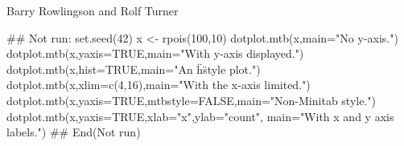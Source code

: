 \begin{Author}\relax
Barry Rowlingson
and Rolf Turner
\end{Author}
\begin{Examples}
\begin{ExampleCode}
## Not run: 
set.seed(42)
x <- rpois(100,10)
dotplot.mtb(x,main="No y-axis.")
dotplot.mtb(x,yaxis=TRUE,main="With y-axis displayed.")
dotplot.mtb(x,hist=TRUE,main="An \"h\" style plot.")
dotplot.mtb(x,xlim=c(4,16),main="With the x-axis limited.")
dotplot.mtb(x,yaxis=TRUE,mtbstyle=FALSE,main="Non-Minitab style.")
dotplot.mtb(x,yaxis=TRUE,xlab="x",ylab="count",
            main="With x and y axis labels.")
## End(Not run)
\end{ExampleCode}
\end{Examples}

